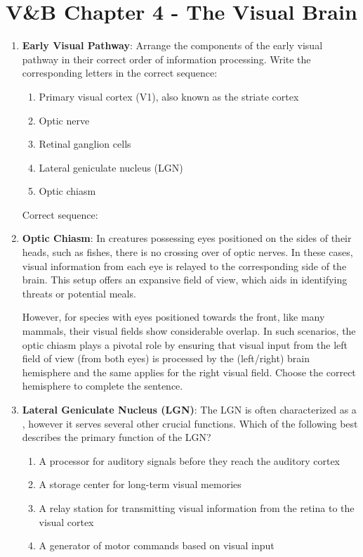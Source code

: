 \documentclass[11pt,letterpaper]{article}
\begin{document}
\section{V\&B Chapter 4 - The Visual Brain}
\begin{enumerate}
    \item \textbf{Early Visual Pathway}: Arrange the components of the early visual pathway in their correct order of information processing. Write the corresponding letters in the correct sequence:
    \begin{enumerate}
        \item Primary visual cortex (V1), also known as the striate cortex
        \item Optic nerve
        \item Retinal ganglion cells
        \item Lateral geniculate nucleus (LGN)
        \item Optic chiasm
    \end{enumerate}
    Correct sequence: \underline{\hspace{6 cm}}

    \item \textbf{Optic Chiasm}: In creatures possessing eyes positioned on the sides of their heads, such as fishes, there is no crossing over of optic nerves. In these cases, visual information from each eye is relayed to the corresponding side of the brain. This setup offers an expansive field of view, which aids in identifying threats or potential meals.

    However, for species with eyes positioned towards the front, like many mammals, their visual fields show considerable overlap. In such scenarios, the optic chiasm plays a pivotal role by ensuring that visual input from the left field of view (from both eyes) is processed by the (left/right) brain hemisphere and the same applies for the right visual field. Choose the correct hemisphere to complete the sentence.

    \item \textbf{Lateral Geniculate Nucleus (LGN)}: The LGN is often characterized as a \underline{\hspace{2 cm}}, however it serves several other crucial functions. Which of the following best describes the primary function of the LGN?
    \begin{enumerate}
        \item A processor for auditory signals before they reach the auditory cortex
        \item A storage center for long-term visual memories
        \item A relay station for transmitting visual information from the retina to the visual cortex
        \item A generator of motor commands based on visual input
    \end{enumerate}


\end{enumerate}
\end{document}
